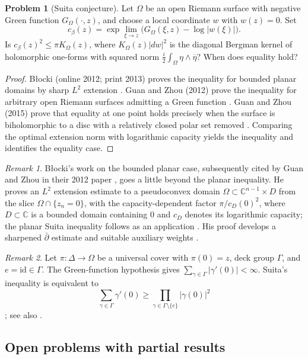 \documentclass[11pt,reqno]{amsart}
\theoremstyle{definition}
\newtheorem{problem}{Problem}[section]
\theoremstyle{remark}
\newtheorem*{remark}{Remark}
\begin{document}
\begin{problem}[Suita conjecture]\label{Z-Suita}
Let $\Omega$ be an open Riemann surface with negative Green function $G_\Omega(\cdot,z)$, and choose a local coordinate $w$ with $w(z)=0$. Set
\[
 c_\beta(z)=\exp\lim_{\xi\to z}
 \bigl(G_\Omega(\xi,z)-\log|w(\xi)|\bigr).
\]
Is $c_\beta(z)^2\leq\pi K_\Omega(z)$, where $K_\Omega(z)|dw|^2$ is the diagonal Bergman kernel of holomorphic one-forms with squared norm $\frac{i}{2}\int_\Omega\eta\wedge\overline\eta$? When does equality hold?
\end{problem}
\begin{proof}
B{\l}ocki (online 2012; print 2013) proves the inequality for bounded planar domains by sharp $L^2$ extension \cite{Z-Blocki}. Guan and Zhou (2012) prove the inequality for arbitrary open Riemann surfaces admitting a Green function \cite{Z-GZ2012}. Guan and Zhou (2015) prove that equality at one point holds precisely when the surface is biholomorphic to a disc with a relatively closed polar set removed \cite[Theorem~3.1]{Z-GZextension}. Comparing the optimal extension norm with logarithmic capacity yields the inequality and identifies the equality case.
\end{proof}
\begin{remark}
B{\l}ocki's work on the bounded planar case, subsequently cited by Guan and Zhou in their 2012 paper \cite[p.~754]{Z-GZ2012}, goes a little beyond the planar inequality. He proves an $L^2$ extension estimate to a pseudoconvex domain $\Omega\subset\mathbb C^{n-1}\times D$ from the slice $\Omega\cap\{z_n=0\}$, with the capacity-dependent factor $\pi/c_D(0)^2$, where $D\subset\mathbb C$ is a bounded domain containing $0$ and $c_D$ denotes its logarithmic capacity; the planar Suita inequality follows as an application \cite[Theorem~1]{Z-Blocki}. His proof develops a sharpened $\bar\partial$ estimate and suitable auxiliary weights \cite[Theorem~2 and \S2]{Z-Blocki}.
\end{remark}
\begin{remark}
Let $\pi:\Delta\to\Omega$ be a universal cover with $\pi(0)=z$, deck group $\Gamma$, and $e=\mathrm{id}\in\Gamma$. The Green-function hypothesis gives $\sum_{\gamma\in\Gamma}|\gamma'(0)|<\infty$. Suita's inequality is equivalent to
\[
 \sum_{\gamma\in\Gamma}\gamma'(0)
 \geq\prod_{\gamma\in\Gamma\setminus\{e\}}|\gamma(0)|^2
\]
\cite{Z-PS1984}; see also \cite[\S6.1]{Zhou2019}.
\end{remark}

\subsection{Open problems with partial results}
\end{document}
